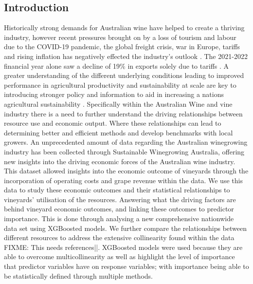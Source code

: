 \documentclass[review,12pt,authoryear]{elsarticle}
\begin{document}
\begin{linenumbers}
\section{Introduction}

Historically strong demands for Australian wine have helped to create a thriving industry, however recent pressures brought on by a loss of tourism and labour due to the COVID-19 pandemic, the global freight crisis, war in Europe, tariffs and rising inflation has negatively effected the industry's outlook \citep{wineaustraliaNationalVintageReport2021,wineaustraliaAustralianWineProduction2021}. The 2021-2022 financial year alone saw a decline of 19\% in exports solely due to tariffs \citep{wineaustraliaNationalVintageReport2022}. A greater understanding of the different underlying conditions leading to improved performance in agricultural productivity and sustainability at scale are key to  introducing stronger policy and information to aid in increasing a nations agricultural sustainability \citep{oecdInnovationProductivitySustainability2019}. Specifically within the Australian Wine and vine industry there is a need to further understand the driving relationships between resource use and economic output. Where these relationships can lead to determining better and efficient methods and develop benchmarks with local growers. \citep{lukemanciniUnderstandingAustralianWine2020}
\newline
An unprecedented amount of data regarding the Australian winegrowing industry has been collected through Sustainable Winegrowing Australia, offering new insights into the driving economic forces of the Australian wine industry. This dataset allowed insights into the economic outcome of vineyards through the incorporation of operating costs and grape revenue within the data. We use this data to study these economic outcomes and their statistical relationships to vineyards' utilisation of the resources. Answering what the driving factors are behind vineyard economic outcomes, and linking these outcomes to predictor importance. This is done through analysing a new comprehensive nationwide data set using XGBoosted models. We further compare the relationships between different resources to address the extensive collinearity found within the data FIXME: This needs references||. XGBoosted models were used because they are able to overcome multicollinearity as well as highlight the level of importance that predictor variables have on response variables; with importance being able to be statistically defined through multiple methods.


\end{linenumbers}
\end{document}
